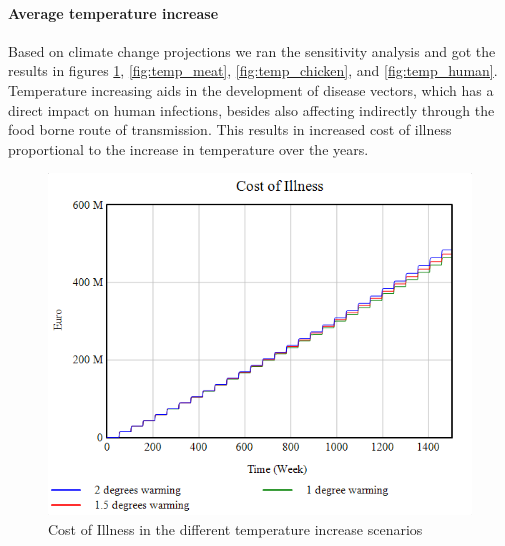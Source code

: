 \paragraph{Average temperature increase}

Based on climate change projections \parencite{knmi_knmi_2015} we ran the sensitivity analysis and got the results in figures \ref{fig:temp_coi}, \ref{fig:temp_meat}, \ref{fig:temp_chicken}, and \ref{fig:temp_human}. Temperature increasing aids in the development of disease vectors, which has a direct impact on human infections, besides also affecting indirectly through the food borne route of transmission. This results in increased cost of illness proportional to the increase in temperature over the years.

\begin{figure}[h!]
    \centering
    \begin{minipage}{0.45\textwidth}
        \centering
        \includegraphics[width=1\textwidth]{images/sensitivity/Temperature projection COI.png} %
        \caption{Cost of Illness in the different temperature increase scenarios}
        \label{fig:temp_coi}
    \end{minipage}\hfill
    \begin{minipage}{0.45\textwidth}
        \centering

\end{minipage}
\end{figure}
